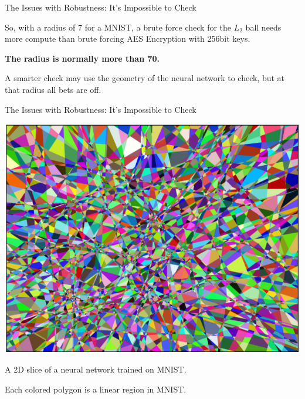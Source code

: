 \documentclass{beamer}
\begin{document}
\begin{frame}{The Issues with Robustness: It's Impossible to Check}
    \begin{center}
    So, with a radius of 7 for a MNIST, a brute force check for the $L_2$ ball needs more compute than brute forcing AES Encryption with 256bit keys. 
    
    \vspace{10pt}
    \textbf{The radius is normally more than 70.}

    \vspace{10pt}
    A smarter check may use the geometry of the neural network to check, but at that radius all bets are off.
    \end{center}
\end{frame}

\begin{frame}{The Issues with Robustness: It's Impossible to Check}
    \begin{center}
        \includegraphics[scale=0.23]{image_of_2d_regions_in_mnist.png}

        A 2D slice of a neural network trained on MNIST. 
        
        Each colored polygon is a linear region in MNIST. \cite{estimate_of_linear_regions}
    \end{center}
\end{frame}
\end{document}
